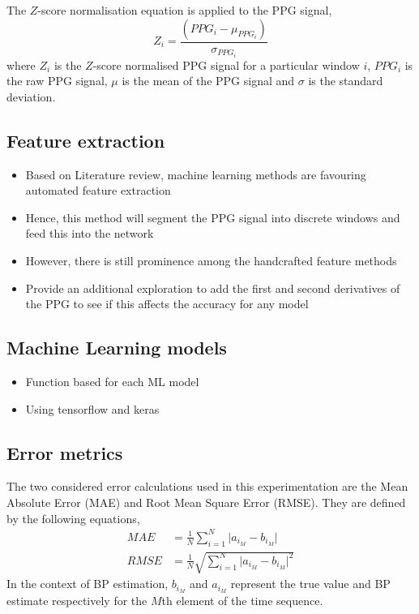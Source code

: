 The $Z$-score normalisation equation is applied to the PPG signal, 
\begin{equation}
    Z_{i} = \frac{(PPG_{i} - \mu_{PPG_i}) }{\sigma_{PPG_i}}
\end{equation} \noindent where $Z_{i}$ is the $Z$-score normalised PPG signal for a particular window $i$, 
$PPG_{i}$ is the raw PPG signal, $\mu$ is the mean of the PPG signal and $\sigma$ is the standard deviation.


\subsection{Feature extraction}
\begin{itemize}
    \item Based on Literature review, machine learning methods are favouring automated feature extraction
    \item Hence, this method will segment the PPG signal into discrete windows and feed this into the network
    \item However, there is still prominence among the handcrafted feature methods
    \item Provide an additional exploration to add the first and second derivatives of the PPG to see if this affects the accuracy for any model
\end{itemize}

\subsection{Machine Learning models}
\begin{itemize}
    \item Function based for each ML model
    \item Using tensorflow and keras
\end{itemize}


\subsection{Error metrics}
The two considered error calculations used in this experimentation are the Mean Absolute Error 
(MAE) and Root Mean Square Error (RMSE). They are defined by the following equations, 
\begin{align}
    MAE &= \frac{1}{N} \sum_{i=1}^N \lvert a_{i_{M}} - b_{i_{M}} \rvert \\
    RMSE &= \frac{1}{N} \sqrt{\sum_{i=1}^N \lvert a_{i_{M}} - b_{i_{M}} \rvert^2}
\end{align}\noindent In the context of BP estimation, $b_{i_{M}}$ and $a_{i_{M}}$ represent the true 
value and BP estimate respectively for the $M$th element of the time sequence.
